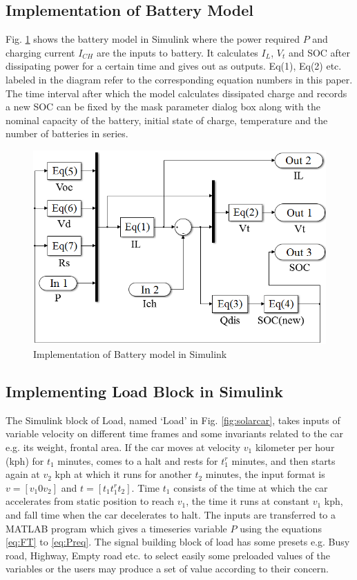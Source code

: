 \documentclass[journal]{IEEEtran/IEEEtran}
\newcommand{\figref}[1]{Fig. \ref{#1}}
\begin{document}
	\subsection{Implementation of Battery Model}
	\figref{fig:batterymask} shows the battery model in Simulink where the power required $P$ and charging current $I_{CH}$ are the inputs to battery. It calculates $I_L$, $V_t$ and SOC after dissipating power for a certain time and gives out as outputs. Eq(1), Eq(2) etc. labeled in the diagram refer to the corresponding equation numbers in this paper. The time interval after which the model calculates dissipated charge and records a new SOC can be fixed by the mask parameter dialog box along with the nominal capacity of the battery, initial state of charge, temperature and the number of batteries in series.
	\begin{figure}[!tb]
		\centering
		\includegraphics[width=\linewidth]{battery_model.png}
		\caption{Implementation of Battery model in Simulink}
		\label{fig:batterymask}
	\end{figure}
	\subsection{Implementing Load Block in Simulink}
	The Simulink block of Load, named ‘Load’ in \figref{fig:solarcar}, takes inputs of variable velocity on different time frames and some invariants related to the car e.g. its weight, frontal area. If the car moves at velocity $v_1$ kilometer per hour (kph) for $t_1$ minutes, comes to a halt and rests for $t_1^r$  minutes, and then starts again at $v_2$  kph at which it runs for another $t_2$ minutes, the input format is $v=[v_1    0    v_2 ]$ and $t=[t_1     t_1^r     t_2 ]$. Time $t_1$  consists of the time at which the car accelerates from static position to reach $v_1$, the time it runs at constant $v_1$  kph, and fall time when the car decelerates to halt. The inputs are transferred to a MATLAB program which gives a timeseries variable $P$ using the equations \eqref{eq:FT} to \eqref{eq:Preq}. The signal building block of load has some presets e.g. Busy road, Highway, Empty road etc. to select easily some preloaded values of the variables or the users may produce a set of value according to their concern.
	
\end{document}
